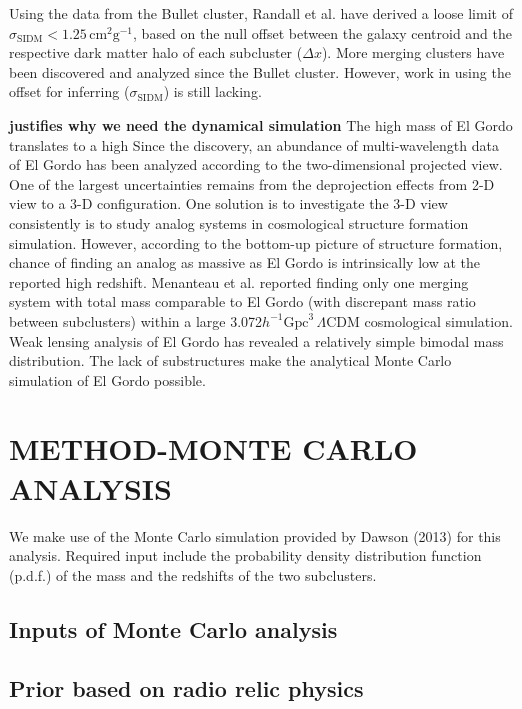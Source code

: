 \documentclass[useAMS,usenatbib]{mn2e}
\begin{document}
Using the data from the Bullet cluster, Randall et al. have derived a loose limit of $\sigma_{\mathrm{SIDM}} < 1.25 \, \mathrm{cm}^2 \mathrm{g}^{-1}$, based on the null offset between the galaxy centroid and the respective dark matter halo of each subcluster ($\Delta x$).
More merging clusters have been discovered and analyzed since the Bullet cluster. However, 
work in using the offset for inferring ($\sigma_{\mathrm{SIDM}}$) is still lacking.

\textbf{justifies why we need the dynamical simulation}
The high mass of El Gordo translates to a high 
Since the discovery, an abundance of multi-wavelength data of El Gordo has been analyzed according to the two-dimensional projected view. One of the largest uncertainties remains from the deprojection effects from 2-D view to a 3-D configuration. One solution is to investigate the 3-D view consistently is to study analog systems in cosmological structure formation simulation. However, according to the bottom-up picture of structure formation, chance of finding an analog as massive as El Gordo is intrinsically low at the reported high redshift. Menanteau et al. reported finding only one merging system with total mass comparable to El Gordo (with discrepant mass ratio between subclusters) within a large 3.072$h^{-1} \mathrm{Gpc}^3 \, \Lambda$CDM cosmological simulation. 
Weak lensing analysis of El Gordo has revealed a relatively simple bimodal mass distribution. The lack of substructures make the analytical Monte Carlo simulation of El Gordo possible.\\



\section[]{METHOD-MONTE CARLO ANALYSIS}
We make use of the Monte Carlo simulation provided by Dawson (2013) for this analysis. Required input include the probability density distribution function (p.d.f.) of the mass and the redshifts of the two subclusters. 
\subsection{Inputs of Monte Carlo analysis}
\subsection{Prior based on radio relic physics}
\end{document}
